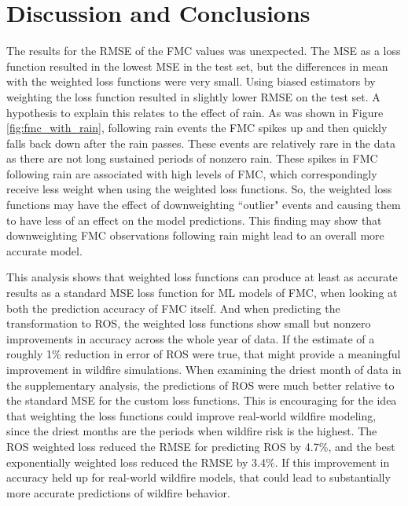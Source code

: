 \documentclass[11pt]{article}%
\begin{document}
\section{Discussion and Conclusions}

The results for the RMSE of the FMC values was unexpected. The MSE as a loss function resulted in the lowest MSE in the test set, but the differences in mean with the weighted loss functions were very small. Using biased estimators by weighting the loss function resulted in slightly lower RMSE on the test set. A hypothesis to explain this relates to the effect of rain. As was shown in Figure \ref{fig:fmc_with_rain}, following rain events the FMC spikes up and then quickly falls back down after the rain passes. These events are relatively rare in the data as there are not long sustained periods of nonzero rain. These spikes in FMC following rain are associated with high levels of FMC, which correspondingly receive less weight when using the weighted loss functions. So, the weighted loss functions may have the effect of downweighting ``outlier" events and causing them to have less of an effect on the model predictions. This finding may show that downweighting FMC observations following rain might lead to an overall more accurate model.

This analysis shows that weighted loss functions can produce at least as accurate results as a standard MSE loss function for ML models of FMC, when looking at both the prediction accuracy of FMC itself. And when predicting the transformation to ROS, the weighted loss functions show small but nonzero improvements in accuracy across the whole year of data. If the estimate of a roughly 1\% reduction in error of ROS were true, that might provide a meaningful improvement in wildfire simulations. When examining the driest month of data in the supplementary analysis, the predictions of ROS were much better relative to the standard MSE for the custom loss functions. This is encouraging for the idea that weighting the loss functions could improve real-world wildfire modeling, since the driest months are the periods when wildfire risk is the highest. The ROS weighted loss reduced the RMSE for predicting ROS by 4.7\%, and the best exponentially weighted loss reduced the RMSE by 3.4\%. If this improvement in accuracy held up for real-world wildfire models, that could lead to substantially more accurate predictions of wildfire behavior.
\end{document}
